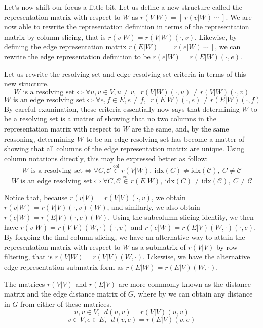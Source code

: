 \documentclass{article}
\begin{document}
Let's now shift our focus a little bit. Let us define a new structure called the representation matrix with respect to \(W\) as \(r(V|W) = \left[\ r(v|W)\ \cdots\ \right]\). We are now able to rewrite the representation definition in terms of the representation matrix by column slicing, that is \(r(v|W) = r(V|W)(\cdot, v)\). Likewise, by defining the edge representation matrix \(r(E|W) = \left[\ r(e|W)\ \cdots\ \right]\), we can rewrite the edge representation definition to be \(r(e|W) = r(E|W)(\cdot, e)\).

Let us rewrite the resolving set and edge resolving set criteria in terms of this new structure.
\[
	W \text{ is a resolving set} \iff \forall u, v \in V, u \neq v,\enspace r(V|W)(\cdot, u) \neq r(V|W)(\cdot, v)
\]
\[
	W \text{ is an edge resolving set} \iff \forall e, f \in E, e \neq f,\enspace r(E|W)(\cdot, e) \neq r(E|W)(\cdot, f)
\]
By careful examination, these criteria essentially now says that determining \(W\) to be a resolving set is a matter of showing that no two columns in the representation matrix with respect to \(W\) are the same, and, by the same reasoning, determining \(W\) to be an edge resolving set has become a matter of showing that all columns of the edge representation matrix are unique. Using column notations directly, this may be expressed better as follow:
\[
	W \text{ is a resolving set} \iff \forall C, \mathcal{C} \overset{\mathrm{col}}{\in} r(V|W),\ \mathrm{idx}(C) \neq \mathrm{idx}(\mathcal{C}),\ C \neq \mathcal{C}
\]
\[
	W \text{ is an edge resolving set} \iff \forall C, \mathcal{C} \overset{\mathrm{col}}{\in} r(E|W),\ \mathrm{idx}(C) \neq \mathrm{idx}(\mathcal{C}),\ C \neq \mathcal{C}
\]

Notice that, because \(r(v|V) = r(V|V)(\cdot, v)\), we obtain \(r(v|W) = r(V|V)(\cdot, v)(W)\), and similarly, we also obtain \(r(e|W) = r(E|V)(\cdot, e)(W)\). Using the subcolumn slicing identity, we then have \(r(v|W) = r(V|V)(W, \cdot)(\cdot, v)\) and \(r(e|W) = r(E|V)(W, \cdot)(\cdot, e)\). By forgoing the final column slicing, we have an alternative way to attain the representation matrix with respect to \(W\) as a submatrix of \(r(V|V)\) by row filtering, that is \(r(V|W) = r(V|V)(W, \cdot)\). Likewise, we have the alternative edge representation submatrix form as \(r(E|W) = r(E|V)(W, \cdot)\).

The matrices \(r(V|V)\) and \(r(E|V)\) are more commonly known as the distance matrix and the edge distance matrix of \(G\), where by we can obtain any distance in \(G\) from either of these matrices.
\[
	u, v \in V,\enspace d(u, v) = r(V|V)(u, v)
\]
\[
	v \in V, e \in E, \enspace d(v, e) = r(E|V)(v, e)
\]
\end{document}
